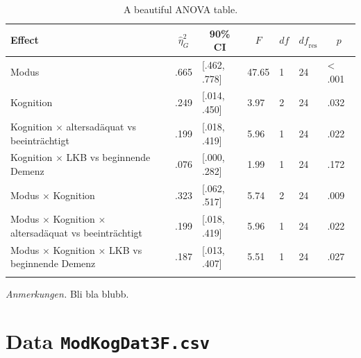 \documentclass[
  doc,floatsintext]{apa6}
\begin{document}
\begin{table}[tbp]

\begin{center}
\begin{threeparttable}

\caption{\label{tab:tabanovaext}A beautiful ANOVA table.}

\begin{tabular}{lllllll}
\toprule
Effect & \multicolumn{1}{c}{$\hat{\eta}^2_G$} & \multicolumn{1}{c}{90\% CI} & \multicolumn{1}{c}{$F$} & \multicolumn{1}{c}{$\mathit{df}$} & \multicolumn{1}{c}{$\mathit{df}_{\mathrm{res}}$} & \multicolumn{1}{c}{$p$}\\
\midrule
Modus & .665 & {}[.462, .778] & 47.65 & 1 & 24 & < .001\\
Kognition & .249 & {}[.014, .450] & 3.97 & 2 & 24 & .032\\
Kognition $\times$  altersadäquat vs beeinträchtigt & .199 & {}[.018, .419] & 5.96 & 1 & 24 & .022\\
Kognition $\times$  LKB vs beginnende Demenz & .076 & {}[.000, .282] & 1.99 & 1 & 24 & .172\\
Modus $\times$ Kognition & .323 & {}[.062, .517] & 5.74 & 2 & 24 & .009\\
Modus $\times$ Kognition $\times$  altersadäquat vs beeinträchtigt & .199 & {}[.018, .419] & 5.96 & 1 & 24 & .022\\
Modus $\times$ Kognition $\times$  LKB vs beginnende Demenz & .187 & {}[.013, .407] & 5.51 & 1 & 24 & .027\\
\bottomrule
\addlinespace
\end{tabular}

\begin{tablenotes}[para]
\normalsize{\textit{Anmerkungen.} Bli bla blubb.}
\end{tablenotes}

\end{threeparttable}
\end{center}

\end{table}

\hypertarget{data-modkogdat3f.csv}{%
\section{\texorpdfstring{Data \texttt{ModKogDat3F.csv}}{Data ModKogDat3F.csv}}\label{data-modkogdat3f.csv}}
\end{document}
